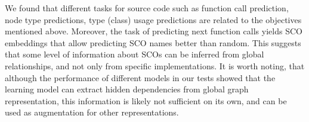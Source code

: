 \documentclass[a4paper,twoside]{article}
\begin{document}
We found that different tasks for source code such as function call prediction, node type predictions, type (class) usage predictions are related to the objectives mentioned above. Moreover, the task of predicting next function calls yields SCO embeddings that allow predicting SCO names better than random. This suggests that some level of information about SCOs can be inferred from global relationships, and not only from specific implementations. It is worth noting, that although the performance of different models in our tests showed that the learning model can extract hidden dependencies from global graph representation, this information is likely not sufficient on its own, and can be used as augmentation for other representations. 



{\small
}
\end{document}
